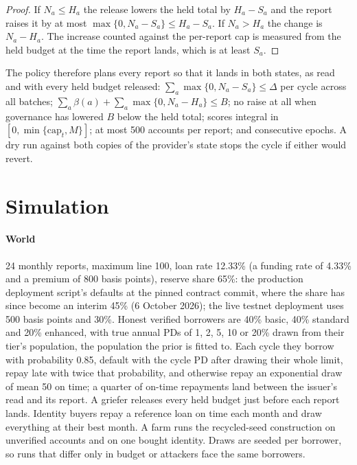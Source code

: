 \documentclass[preprint,11pt,authoryear]{elsarticle}
\begin{document}
\begin{proof}
If $N_a\le H_a$ the release lowers the held total by $H_a-S_a$ and the report raises it by at most
$\max\{0,N_a-S_a\}\le H_a-S_a$. If $N_a>H_a$ the change is $N_a-H_a$. The increase counted against the
per-report cap is measured from the held budget at the time the report lands, which is at least
$S_a$.
\end{proof}

The policy therefore plans every report so that it lands in both states, as read and with every
held budget released: $\sum_a\max\{0,N_a-S_a\}\le\Delta$ per cycle across all batches;
$\sum_a\beta(a)+\sum_a\max\{0,N_a-H_a\}\le B$; no raise at all when governance has lowered $B$
below the held total; scores integral in $[0,\min\{\mathrm{cap}_t,M\}]$; at most 500 accounts per
report; and consecutive epochs. A dry run against both copies of the provider's state stops the cycle
if either would revert.

\section{Simulation}\label{sec:sim}

\paragraph{World} 24 monthly reports, maximum line 100, loan rate 12.33\% (a funding rate of 4.33\%
and a premium of 800 basis points), reserve share 65\%: the production deployment script's defaults
at the pinned contract commit, where the share has since become an interim 45\% (6 October 2026);
the live testnet deployment uses 500 basis points and 30\%. Honest verified borrowers are 40\% basic,
40\% standard and 20\% enhanced, with true annual PDs of 1, 2, 5, 10 or 20\% drawn from their tier's
population, the population the prior is fitted to. Each cycle they borrow with probability 0.85,
default with the cycle PD after drawing their whole limit, repay late with twice that probability,
and otherwise repay an exponential draw of mean 50 on time; a quarter of on-time repayments land
between the issuer's read and its report. A griefer releases every held budget just before each
report lands. Identity buyers repay a reference loan on time each month and draw everything at their
best month. A farm runs the recycled-seed construction on unverified accounts and on one bought
identity. Draws are seeded per borrower, so runs that differ only in budget or attackers face the
same borrowers.
\end{document}
